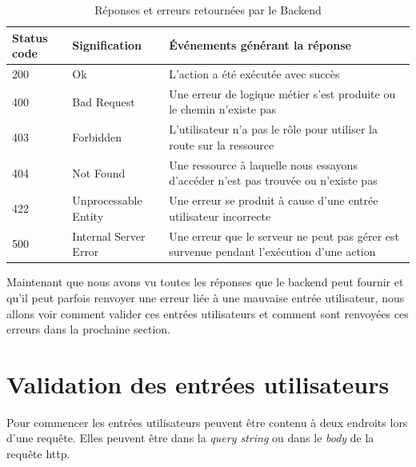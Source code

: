 \documentclass[
    iai, %
    il, %
]{heig-tb}
\begin{document}
\begin{table}[h]
    \begin{center}
        \caption{Réponses et erreurs retournées par le Backend \label{reponses-erreurs-backend}}
        \begin{tabularx}{1.0\textwidth} {l|l|X}
            Status code & Signification         & Événements générant la réponse                                                                   \\ \hline
            200         & Ok                    & L'action a été exécutée avec succès                                                              \\
            400         & Bad Request           & Une erreur de logique métier s'est produite ou  le chemin n'existe pas                 \\
            403         & Forbidden             & L'utilisateur n'a pas le rôle pour utiliser la route sur la ressource                            \\
            404         & Not Found             & Une ressource à laquelle nous essayons d'accéder n'est pas trouvée ou n'existe pas        \\
            422         & Unprocessable Entity  & Une erreur se produit à cause d'une entrée utilisateur incorrecte                         \\
            500         & Internal Server Error & Une erreur que le serveur ne peut pas gérer est survenue pendant l'exécution d'une action \\
        \end{tabularx}
    \end{center}
\end{table}

Maintenant que nous avons vu toutes les réponses que le \Gls{backend} peut fournir et qu'il peut parfois renvoyer une erreur liée à une mauvaise entrée utilisateur, nous allons voir comment valider ces entrées utilisateurs et comment sont renvoyées ces erreurs dans la prochaine section.

\section{Validation des entrées utilisateurs}
Pour commencer les entrées utilisateurs peuvent être contenu à deux endroits lors d'une requête. Elles peuvent être dans la \emph{query string} ou dans le \emph{body} de la requête \Gls{http}.
\end{document}
